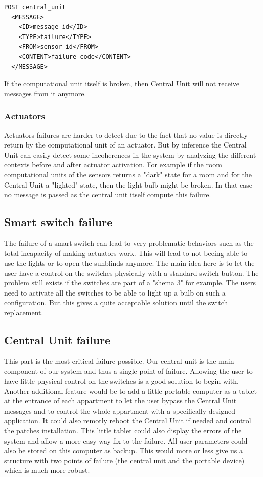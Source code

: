 \documentclass{acm_proc_article-sp}
\begin{document}
\begin{minipage}{\linewidth}
\begin{lstlisting}
POST central_unit 
  <MESSAGE>
    <ID>message_id</ID>
    <TYPE>failure</TYPE>
    <FROM>sensor_id</FROM>
    <CONTENT>failure_code</CONTENT>
  </MESSAGE>
\end{lstlisting}
\end{minipage}

If the computational unit itself is broken, then Central Unit will not receive messages from it anymore.
\subsubsection{Actuators} 
Actuators failures are harder to detect due to the fact that no value is directly return by the computational unit of an actuator.
But by inference the Central Unit can easily detect some incoherences in the system by analyzing the different contexts before and after actuator activation.
For example if the room computational units of the sensors returns a "dark" state for a room and for the Central Unit a "lighted" state, then the light bulb might be broken.
In that case no message is passed as the central unit itself compute this failure.
\subsection{Smart switch failure}
The failure of a smart switch can lead to very problematic behaviors such as the total incapacity of making actuators work.
This will lead to not beeing able to use the lights or to open the sunblinds anymore.
The main idea here is to let the user have a control on the switches physically with a standard switch button.
The problem still exists if the switches are part of a "shema 3" for example. The users need to activate all the switches to be able to light up a bulb on such a configuration.
But this gives a quite acceptable solution until the switch replacement.

\subsection{Central Unit failure}
This part is the most critical failure possible.
Our central unit is the main component of our system and thus a single point of failure.
Allowing the user to have little physical control on the switches is a good solution to begin with.
Another additional feature would be to add a little portable computer as a tablet at the entrance of each appartment 
to let the user bypass the Central Unit messages and to control the whole appartment with a specifically designed application.
It could also remotly reboot the Central Unit if needed and control the patches installation.
This little tablet could also display the errors of the system and allow a more easy way fix to the failure.
All user parameters could also be stored on this computer as backup.
This would more or less give us a structure with two points of failure (the central unit and the portable device) which is much more robust.
\end{document}
